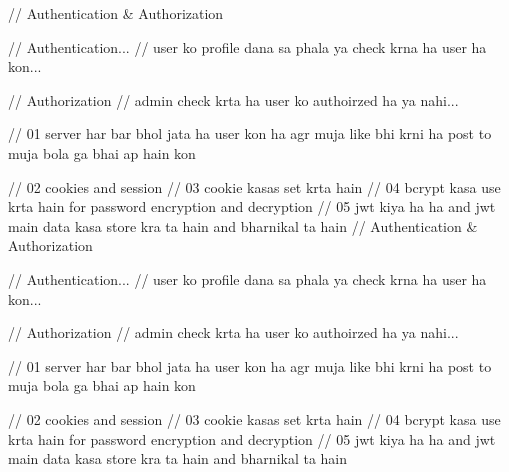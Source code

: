 // Authentication & Authorization 

// Authentication...
// user ko profile dana sa phala ya check krna ha user ha kon...

// Authorization
// admin check krta ha user ko authoirzed ha ya nahi...


// 01 server har bar bhol jata ha user kon ha agr muja like bhi krni ha post to muja bola ga bhai ap hain kon

// 02 cookies and session
// 03 cookie kasas set krta hain 
// 04 bcrypt kasa use krta hain for password encryption and decryption
// 05 jwt kiya ha ha and jwt main data kasa store kra ta hain and bharnikal ta hain
// Authentication & Authorization 

// Authentication...
// user ko profile dana sa phala ya check krna ha user ha kon...

// Authorization
// admin check krta ha user ko authoirzed ha ya nahi...


// 01 server har bar bhol jata ha user kon ha agr muja like bhi krni ha post to muja bola ga bhai ap hain kon

// 02 cookies and session
// 03 cookie kasas set krta hain 
// 04 bcrypt kasa use krta hain for password encryption and decryption
// 05 jwt kiya ha ha and jwt main data kasa store kra ta hain and bharnikal ta hain
